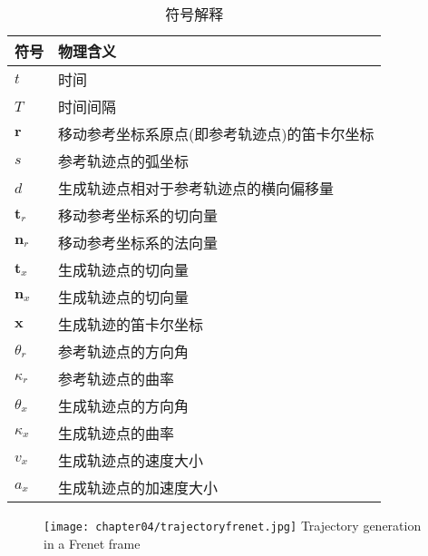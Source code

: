 \begin{table}[htbp]
  \centering
  \caption{符号解释}
    \begin{tabular}{ll}
    \toprule
    符号    & 物理含义 \\
    \midrule
    $t$          & 时间 \\
    $T$          & 时间间隔 \\
    $\bm{r}$     & 移动参考坐标系原点(即参考轨迹点)的笛卡尔坐标 \\
    $s$          & 参考轨迹点的弧坐标 \\
    $d$          & 生成轨迹点相对于参考轨迹点的横向偏移量 \\
    $\bm{t}_r$   & 移动参考坐标系的切向量 \\
    $\bm{n}_r$   & 移动参考坐标系的法向量 \\
    $\bm{t}_x$   & 生成轨迹点的切向量 \\
    $\bm{n}_x$   & 生成轨迹点的切向量 \\
    $\bm{x}$     & 生成轨迹的笛卡尔坐标 \\
    $\theta_r$   & 参考轨迹点的方向角 \\
    $\kappa_r$   & 参考轨迹点的曲率 \\
    $\theta_x$   & 生成轨迹点的方向角 \\
    $\kappa_x$   & 生成轨迹点的曲率 \\
    $v_x$  & 生成轨迹点的速度大小 \\
    $a_x$  & 生成轨迹点的加速度大小 \\
    \bottomrule
    \end{tabular}%
  \label{tab:frenetsymbol}%
\end{table}%

\begin{figure}[!htp]
  \centering
  \texttt{[image: chapter04/trajectoryfrenet.jpg]}
    {Trajectory generation in a Frenet frame}
  \label{fig:trajectoryfrenet}
\end{figure}

